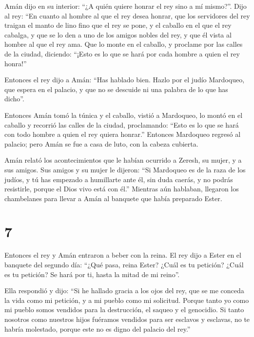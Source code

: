 Amán dijo en su interior: ``¿A quién quiere honrar el rey sino a mí
mismo?''.  Dijo al rey: ``En cuanto al hombre al que el
rey desea honrar,  que los servidores del rey traigan el
manto de lino fino que el rey se pone, y el caballo en el que el rey
cabalga,  y que se lo den a uno de los amigos nobles del
rey, y que él vista al hombre al que el rey ama. Que lo monte en el
caballo, y proclame por las calles de la ciudad, diciendo: ``¡Esto es lo
que se hará por cada hombre a quien el rey honra!''

 Entonces el rey dijo a Amán: ``Has hablado bien. Hazlo
por el judío Mardoqueo, que espera en el palacio, y que no se descuide
ni una palabra de lo que has dicho''.

 Entonces Amán tomó la túnica y el caballo, vistió a
Mardoqueo, lo montó en el caballo y recorrió las calles de la ciudad,
proclamando: ``Esto es lo que se hará con todo hombre a quien el rey
quiera honrar.''  Entonces Mardoqueo regresó al palacio;
pero Amán se fue a casa de luto, con la cabeza cubierta.

 Amán relató los acontecimientos que le habían ocurrido a
Zeresh, su mujer, y a sus amigos. Sus amigos y su mujer le dijeron: ``Si
Mardoqueo es de la raza de los judíos, y tú has empezado a humillarte
ante él, sin duda caerás, y no podrás resistirle, porque el Dios vivo
está con él.''  Mientras aún hablaban, llegaron los
chambelanes para llevar a Amán al banquete que había preparado Ester.

\hypertarget{section-6}{%
\section{7}\label{section-6}}

 Entonces el rey y Amán entraron a beber con la reina.
 El rey dijo a Ester en el banquete del segundo día:
``¿Qué pasa, reina Ester? ¿Cuál es tu petición? ¿Cuál es tu petición? Se
hará por ti, hasta la mitad de mi reino''.

 Ella respondió y dijo: ``Si he hallado gracia a los ojos
del rey, que se me conceda la vida como mi petición, y a mi pueblo como
mi solicitud.  Porque tanto yo como mi pueblo somos
vendidos para la destrucción, el saqueo y el genocidio. Si tanto
nosotros como nuestros hijos fuéramos vendidos para ser esclavos y
esclavas, no te habría molestado, porque este no es digno del palacio
del rey.''

